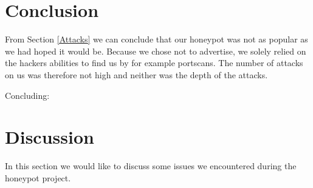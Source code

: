 \documentclass[11pt]{article}
\begin{document}
\section{Conclusion}
\label{Conclusion}
From Section \ref{Attacks} we can conclude that our honeypot was not as popular as we had hoped it would be. Because we chose not to advertise, we solely relied on the hackers abilities to find us by for example portscans. The number of attacks on us was therefore not high and neither was the depth of the attacks. 

Concluding: 


\section{Discussion}
\label{Discussion}
In this section we would like to discuss some issues we encountered during the honeypot project. 
\end{document}
